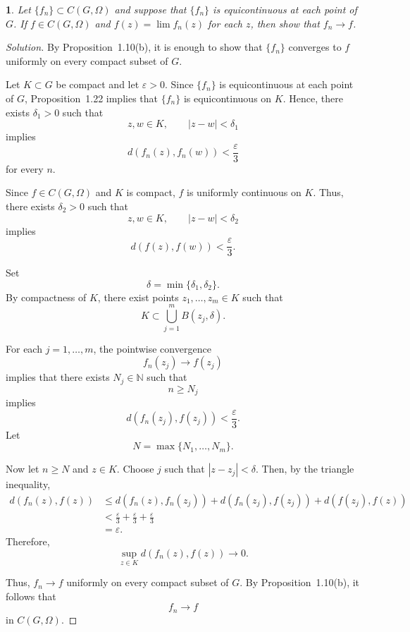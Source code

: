 \documentclass[12pt, a4paper]{report}
\theoremstyle{spaced}
\newtheorem{exercise}{}
\newcommand{\setexercise}[1]{\setcounter{exercise}{#1-1}}
\begin{document}
\setexercise{7}
\begin{exercise}
	Let $\{f_n\}\subset C(G,\Omega)$ and suppose that $\{f_n\}$ is equicontinuous at each point of $G$.
	If $f\in C(G,\Omega)$ and $f(z)=\lim f_n(z)$ for each $z$, then show that $f_n\to f$.
\end{exercise}

\begin{proof}[Solution]
	By Proposition~1.10(b), it is enough to show that $\{f_n\}$ converges to $f$
	uniformly on every compact subset of $G$.

	Let $K \subset G$ be compact and let $\varepsilon>0$. Since $\{f_n\}$ is
	equicontinuous at each point of $G$, Proposition~1.22 implies that
	$\{f_n\}$ is equicontinuous on $K$. Hence, there exists $\delta_1>0$ such
	that
	\[
		z,w\in K,\qquad |z-w|<\delta_1
	\]
	implies
	\[
		d(f_n(z),f_n(w))<\frac{\varepsilon}{3}
	\]
	for every $n$.

	Since $f\in C(G,\Omega)$ and $K$ is compact, $f$ is uniformly continuous
	on $K$. Thus, there exists $\delta_2>0$ such that
	\[
		z,w\in K,\qquad |z-w|<\delta_2
	\]
	implies
	\[
		d(f(z),f(w))<\frac{\varepsilon}{3}.
	\]

	Set
	\[
		\delta=\min\{\delta_1,\delta_2\}.
	\]
	By compactness of $K$, there exist points $z_1,\ldots,z_m\in K$ such that
	\[
		K\subset \bigcup_{j=1}^m B(z_j,\delta).
	\]

	For each $j=1,\ldots,m$, the pointwise convergence
	\[
		f_n(z_j)\longrightarrow f(z_j)
	\]
	implies that there exists $N_j\in\mathbb{N}$ such that
	\[
		n\geq N_j
	\]
	implies
	\[
		d(f_n(z_j),f(z_j))<\frac{\varepsilon}{3}.
	\]
	Let
	\[
		N=\max\{N_1,\ldots,N_m\}.
	\]

	Now let $n\geq N$ and $z\in K$. Choose $j$ such that
	$|z-z_j|<\delta$. Then, by the triangle inequality,
	\[
		\begin{aligned}
			d(f_n(z),f(z))
			 & \leq d(f_n(z),f_n(z_j))
			+d(f_n(z_j),f(z_j))
			+d(f(z_j),f(z))            \\
			 & < \frac{\varepsilon}{3}
			+\frac{\varepsilon}{3}
			+\frac{\varepsilon}{3}     \\
			 & =\varepsilon.
		\end{aligned}
	\]
	Therefore,
	\[
		\sup_{z\in K} d(f_n(z),f(z))\longrightarrow 0.
	\]

	Thus, $f_n\to f$ uniformly on every compact subset of $G$. By
	Proposition~1.10(b), it follows that
	\[
		f_n\longrightarrow f
	\]
	in $C(G,\Omega)$.
\end{proof}\setexercise{8}
\end{document}
